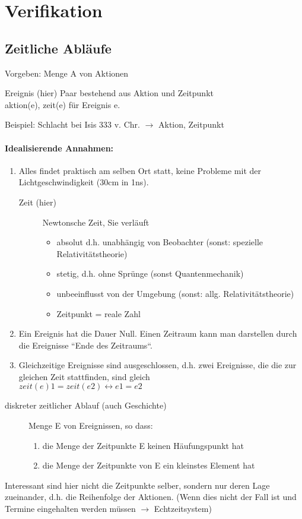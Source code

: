 \chapter{Verifikation}

\section{Zeitliche Abläufe}
Vorgeben: Menge A von Aktionen
\begin{description}
\item {Ereignis (hier)} Paar bestehend aus Aktion und Zeitpunkt\\aktion(e), zeit(e) für Ereignis e.
\end{description}
Beispiel: Schlacht bei Isis 333 v. Chr. $\rightarrow$ Aktion, Zeitpunkt
\subsubsection*{Idealisierende Annahmen:}
\begin{enumerate}
\item Alles findet praktisch am selben Ort statt, keine Probleme mit der Lichtgeschwindigkeit (30cm in 1ns).
	\begin{description}
	\item[Zeit (hier)] Newtonsche Zeit, Sie verläuft
		\begin{itemize}
		\item absolut d.h. unabhängig von Beobachter (sonst: spezielle Relativitätstheorie)
		\item stetig, d.h. ohne Sprünge (sonst Quantenmechanik)
		\item unbeeinflusst von der Umgebung (sonst: allg. Relativitätstheorie)
		\item Zeitpunkt = reale Zahl
		\end{itemize}
	\end{description}
\item Ein Ereignis hat die Dauer Null. Einen Zeitraum kann man darstellen durch die Ereignisse “Ende des Zeitraums“.
\item Gleichzeitige Ereignisse sind ausgeschlossen, d.h. zwei Ereignisse, die die zur gleichen Zeit stattfinden, sind gleich\\
$zeit(e)1 = zeit(e2) \leftrightarrow e1 = e2 $
\end{enumerate}

\begin{description}
	\item[diskreter zeitlicher Ablauf (auch Geschichte)] Menge E von Ereignissen, so dass:
	\begin{enumerate}
		\item die Menge der Zeitpunkte E keinen Häufungspunkt hat
		\item die Menge der Zeitpunkte von E ein kleinstes Element hat
	\end{enumerate}
\end{description}
Interessant sind hier nicht die Zeitpunkte selber, sondern nur deren Lage zueinander, d.h. die Reihenfolge der Aktionen. (Wenn dies nicht der Fall ist und Termine eingehalten werden müssen $\rightarrow$ Echtzeitsystem)

